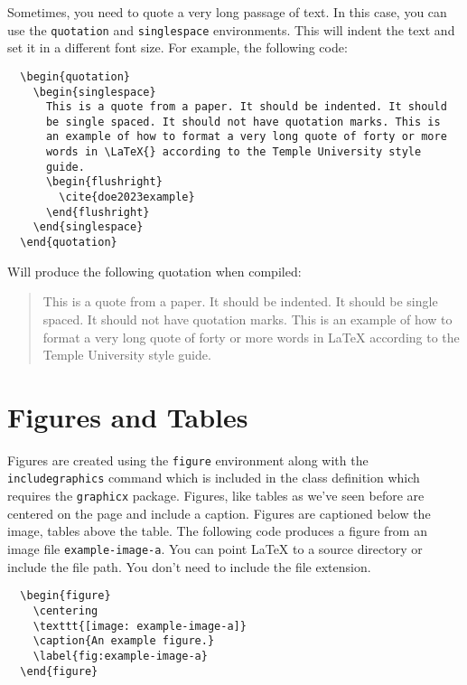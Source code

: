 \documentclass{thesis-dissertation}
\begin{document}
Sometimes, you need to quote a very long passage of text. In this case, you can use the \texttt{quotation} and \texttt{singlespace} environments. This will indent the text and set it in a different font size. For example, the following code: \begin{singlespace}\begin{verbatim}
  \begin{quotation}
    \begin{singlespace}
      This is a quote from a paper. It should be indented. It should 
      be single spaced. It should not have quotation marks. This is 
      an example of how to format a very long quote of forty or more 
      words in \LaTeX{} according to the Temple University style 
      guide.
      \begin{flushright}
        \cite{doe2023example}
      \end{flushright}
    \end{singlespace}
  \end{quotation}
\end{verbatim}
\end{singlespace}
Will produce the following quotation when compiled:\begin{quotation}\begin{singlespace}This is a quote from a paper. It should be indented. It should be single spaced. It should not have quotation marks. This is an example of how to format a very long quote of forty or more words in \LaTeX{} according to the Temple University style guide.\begin{flushright}\cite{doe2023example}\end{flushright}
\end{singlespace}\end{quotation}

\section{Figures and Tables}
Figures are created using the \texttt{figure} environment along with the \texttt{includegraphics} command which is included in the class definition which requires the \texttt{graphicx} package. Figures, like tables as we've seen before are centered on the page and include a caption. Figures are captioned below the image, tables above the table. The following code produces a figure from an image file \texttt{example-image-a}. You can point \LaTeX{} to a source directory or include the file path. You don't need to include the file extension.\begin{singlespace}
  \begin{verbatim}
  \begin{figure}
    \centering
    \texttt{[image: example-image-a]}
    \caption{An example figure.}
    \label{fig:example-image-a}
  \end{figure}
\end{verbatim}
\end{singlespace}
\end{document}
